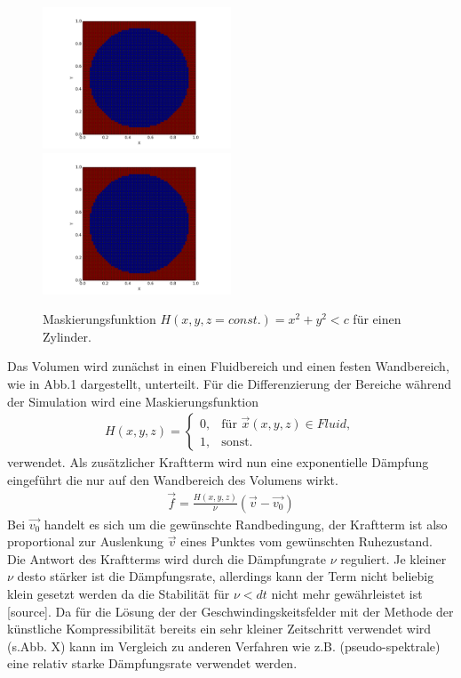 \begin{figure}
  \begin{center}
  \includegraphics[width=0.5\textwidth]{gfx/immersed_boundary/mask.png}\label{fig:mask_vp}
  \includegraphics[width=0.5\textwidth]{gfx/immersed_boundary/mask.png}\label{fig:mask_vp}
  \end{center}
  \caption{Maskierungsfunktion $H(x,y,z=const.) = x^2 + y^2 < c$ für einen Zylinder. }
\end{figure}

Das Volumen wird zunächst in einen Fluidbereich und einen festen Wandbereich, wie in Abb.1 dargestellt, unterteilt. Für die Differenzierung der Bereiche während der Simulation wird  eine Maskierungsfunktion
\begin{align}
H(x, y, z) = \begin{cases}
                    0, & \text{für } \vec{x}(x,y,z) \in Fluid, \\
                    1, & \text{sonst}.
             \end{cases}
\end{align}
verwendet. Als zusätzlicher Kraftterm wird nun eine exponentielle Dämpfung eingeführt die nur auf den Wandbereich des Volumens wirkt.
\begin{align}
\vec{f} = \frac{H(x, y, z)}{\nu}(\vec{v} - \vec{v_0})
\end{align}
Bei $\vec{v_0}$ handelt es sich um die gewünschte Randbedingung, der Kraftterm ist also proportional zur Auslenkung $\vec{v}$ eines Punktes vom gewünschten Ruhezustand.
Die Antwort des Kraftterms wird durch die Dämpfungrate $\nu$ reguliert. Je kleiner $\nu$ desto stärker ist die Dämpfungsrate, allerdings kann der Term
nicht beliebig klein gesetzt werden da die Stabilität für $\nu < dt$ nicht mehr gewährleistet ist [source].
Da für die Lösung der der Geschwindingskeitsfelder mit der Methode der künstliche Kompressibilität  bereits ein sehr kleiner Zeitschritt verwendet wird (s.Abb. X)
kann im Vergleich zu anderen Verfahren wie z.B. (pseudo-spektrale) eine relativ starke Dämpfungsrate verwendet werden.

